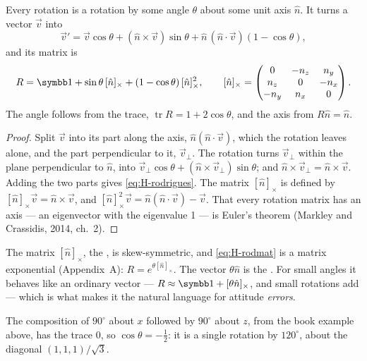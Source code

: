 \begin{theorem}
\label{thm:H-rodrigues}
Every rotation is a rotation by some angle $\theta$ about some unit axis $\hat n$. It turns a vector $\vec v$ into
\begin{equation}\label{eq:H-rodrigues}
  \vec v' = \vec v\cos\theta + (\hat n \times \vec v)\sin\theta + \hat n\,(\hat n \cdot \vec v)(1 - \cos\theta) ,
\end{equation}
and its matrix is
\begin{equation}\label{eq:H-rodmat}
  R = \Id + \sin\theta\,[\hat n]_\times + (1 - \cos\theta)\,[\hat n]_\times^2, \qquad
  [\hat n]_\times = \begin{pmatrix}0 & -n_z & n_y\\ n_z & 0 & -n_x\\ -n_y & n_x & 0\end{pmatrix} .
\end{equation}
The angle follows from the trace, $\operatorname{tr}R = 1 + 2\cos\theta$, and the axis from $R\hat n = \hat n$.
\end{theorem}
\begin{proof}
Split $\vec v$ into its part along the axis, $\hat n(\hat n \cdot \vec v)$, which the rotation leaves alone, and the part perpendicular to it, $\vec v_\perp$. The rotation turns $\vec v_\perp$ within the plane perpendicular to $\hat n$, into $\vec v_\perp\cos\theta + (\hat n \times \vec v_\perp)\sin\theta$; and $\hat n \times \vec v_\perp = \hat n \times \vec v$. Adding the two parts gives \cref{eq:H-rodrigues}. The matrix $[\hat n]_\times$ is defined by $[\hat n]_\times\vec v = \hat n \times \vec v$, and $[\hat n]_\times^2\vec v = \hat n(\hat n \cdot \vec v) - \vec v$. That every rotation matrix has an axis — an eigenvector with the eigenvalue 1 — is Euler's theorem (Markley and Crassidis, 2014, ch.~2).
\end{proof}

The matrix $[\hat n]_\times$, the , is skew-symmetric, and \cref{eq:H-rodmat} is a matrix exponential (Appendix~A): $R = e^{\theta[\hat n]_\times}$. The vector $\theta\hat n$ is the . For small angles it behaves like an ordinary vector — $R \approx \Id + [\theta\hat n]_\times$, and small rotations add — which is what makes it the natural language for attitude \emph{errors}.

The composition of $90^\circ$ about $x$ followed by $90^\circ$ about $z$, from the book example above, has the trace 0, so $\cos\theta = -\tfrac12$: it is a single rotation by $120^\circ$, about the diagonal $(1, 1, 1)/\sqrt3$.

